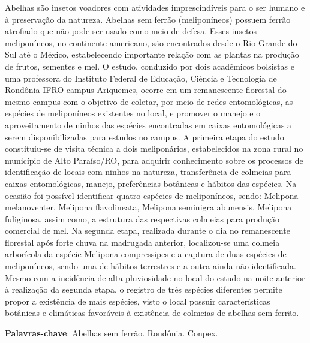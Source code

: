 \documentclass[article,12pt,onesidea,4paper,english,brazil]{abntex2}
\begin{document}
	\noindent Abelhas são insetos voadores com atividades imprescindíveis para o ser humano e à preservação da natureza. Abelhas sem ferrão (meliponíneos) possuem ferrão atrofiado que não pode ser usado como meio de defesa. Esses insetos meliponíneos, no continente americano, são encontrados desde o Rio Grande do Sul até o México, estabelecendo importante relação com as plantas na produção de frutos, sementes e mel. O estudo, conduzido por dois acadêmicos bolsistas e uma professora do Instituto Federal de Educação, Ciência e Tecnologia de Rondônia-IFRO campus Ariquemes, ocorre em um remanescente florestal do mesmo campus com o objetivo de coletar, por meio de redes entomológicas, as espécies de meliponíneos existentes no local, e promover o manejo e o aproveitamento de ninhos das espécies encontradas em caixas entomológicas a serem disponibilizadas para estudos no campus. A primeira etapa do estudo constituiu-se de visita técnica a dois meliponários, estabelecidos na zona rural no município de Alto Paraíso/RO, para adquirir conhecimento sobre os processos de identificação de locais com ninhos na natureza, transferência de colmeias para caixas entomológicas, manejo, preferências botânicas e hábitos das espécies. Na ocasião foi possível identificar quatro espécies de meliponíneos, sendo: Melipona melanoventer, Melipona flavolineata, Melipona seminigra abunensis, Melipona fuliginosa, assim como, a estrutura das respectivas colmeias para produção comercial de mel. Na segunda etapa, realizada durante o dia no remanescente florestal após forte chuva na madrugada anterior, localizou-se uma colmeia arborícola da espécie Melipona compressipes e a captura de duas espécies de meliponíneos, sendo uma de hábitos terrestres e a outra ainda não identificada. Mesmo com a incidência de alta pluviosidade no local do estudo na noite anterior à realização da segunda etapa, o registro de três espécies diferentes permite propor a existência de mais espécies, visto o local possuir características botânicas e climáticas favoráveis à existência de colmeias de abelhas sem ferrão.
	
	\vspace{\onelineskip}
	
	\noindent
	\textbf{Palavras-chave}: Abelhas sem ferrão. Rondônia. Conpex.
	
\end{document}

